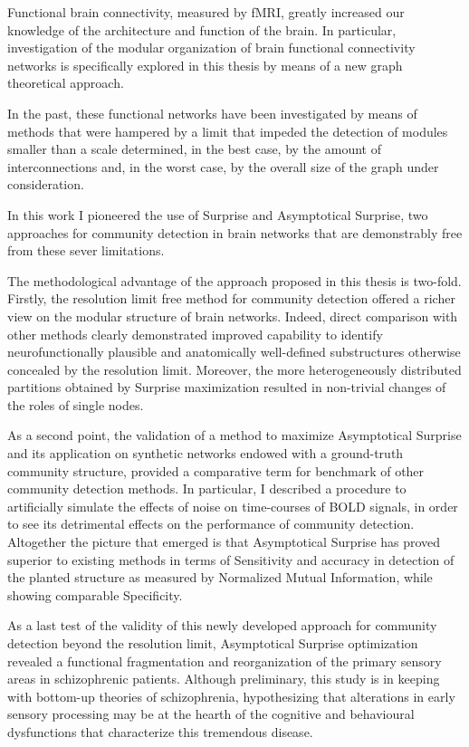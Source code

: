 Functional brain connectivity, measured by fMRI, greatly increased our knowledge of the architecture and function of the brain.
In particular, investigation of the modular organization of brain functional connectivity networks is specifically explored in this thesis by means of a new graph theoretical approach.

In the past, these functional networks have been investigated by means of methods that were hampered by a limit that impeded the detection of modules smaller than a scale determined, in the best case, by the amount of interconnections and, in the worst case, by the overall size of the graph under consideration.

In this work I pioneered the use of Surprise and Asymptotical Surprise, two approaches for community detection in brain networks that are demonstrably free from these sever limitations.

The methodological advantage of the approach proposed in this thesis is two-fold.
Firstly, the resolution limit free method for community detection offered a richer view on the modular structure of brain networks.
Indeed, direct comparison with other methods clearly demonstrated improved capability to identify neurofunctionally plausible and anatomically well-defined substructures otherwise concealed by the resolution limit.
Moreover, the more heterogeneously distributed partitions obtained by Surprise maximization resulted in non-trivial changes of the roles of single nodes.

As a second point, the validation of a method to maximize Asymptotical Surprise and its application on synthetic networks endowed with a ground-truth community structure, provided a comparative term for benchmark of other community detection methods.
In particular, I described a procedure to artificially simulate the effects of noise on time-courses of BOLD signals, in order to see its detrimental effects on the performance of community detection.
Altogether the picture that emerged is that Asymptotical Surprise has proved superior to existing methods in terms of Sensitivity and accuracy in detection of the planted structure as measured by Normalized Mutual Information, while showing comparable Specificity.

As a last test of the validity of this newly developed approach for community detection beyond the resolution limit, Asymptotical Surprise optimization revealed a functional fragmentation and reorganization of the primary sensory areas in schizophrenic patients.
Although preliminary, this study is in keeping with bottom-up theories of schizophrenia, hypothesizing that alterations in early sensory processing may be at the hearth of the cognitive and behavioural dysfunctions that characterize this tremendous disease.

